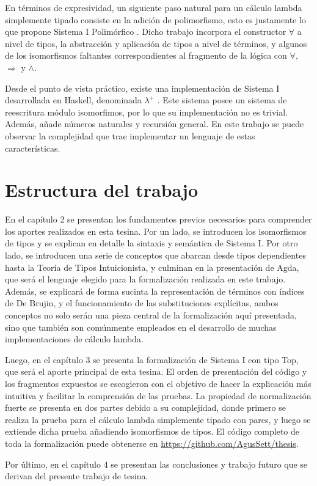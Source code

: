 En términos de expresividad, un siguiente paso natural para un cálculo lambda simplemente tipado consiste en la adición de polimorfismo, esto es justamente lo que propone Sistema I Polimórfico \cite{sip, sip-paper}.
Dicho trabajo incorpora el constructor $\forall$ a nivel de tipos, la abstracción y aplicación de tipos a nivel de términos, y algunos de los isomorfismos faltantes correspondientes al fragmento de la lógica con $\forall$, $\Rightarrow$ y $\wedge$.

Desde el punto de vista práctico, existe una implementación de Sistema I desarrollada en Haskell, denominada $\lambda^+$ \cite{lambda-plus}.
Este sistema posee un sistema de reescritura módulo isomorfimos, por lo que su implementación no es trivial.
Además, añade números naturales y recursión general.
En este trabajo se puede observar la complejidad que trae implementar un lenguaje de estas características.

\section{Estructura del trabajo}

En el capítulo 2 se presentan los fundamentos previos necesarios para comprender los aportes realizados en esta tesina.
Por un lado, se introducen los isomorfismos de tipos y se explican en detalle la sintaxis y semántica de Sistema I.
Por otro lado, se introducen una serie de conceptos que abarcan desde tipos dependientes hasta la Teoría de Tipos Intuicionista, y culminan en la presentación de Agda, que será el lenguaje elegido para la formalización realizada en este trabajo.
Además, se explicará de forma sucinta la representación de términos con índices de De Brujin, y el funcionamiento de las substituciones explícitas, ambos conceptos no solo serán una pieza central de la formalización aquí presentada, sino que también son comúnmente empleados en el desarrollo de muchas implementaciones de cálculo lambda.

Luego, en el capítulo 3 se presenta la formalización de Sistema I con tipo Top, que será el aporte principal de esta tesina.
El orden de presentación del código y los fragmentos expuestos se escogieron con el objetivo de hacer la explicación más intuitiva y facilitar la comprensión de las pruebas.
La propiedad de normalización fuerte se presenta en dos partes debido a su complejidad, donde primero se realiza la prueba para el cálculo lambda simplemente tipado con pares, y luego se extiende dicha prueba añadiendo isomorfismos de tipos.
El código completo de toda la formalización puede obtenerse en \url{https://github.com/AgusSett/thesis}.

Por último, en el capítulo 4 se presentan las conclusiones y trabajo futuro que se derivan del presente trabajo de tesina.